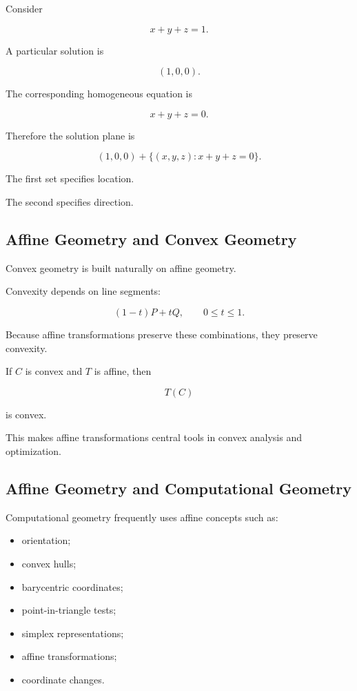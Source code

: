 Consider

\[ x+y+z=1. \]

A particular solution is

\[ (1,0,0). \]

The corresponding homogeneous equation is

\[ x+y+z=0. \]

Therefore the solution plane is

\[
\boxed{
(1,0,0)+
\{(x,y,z):x+y+z=0\}.
}
\]

The first set specifies location.

The second specifies direction.

\subsection{Affine Geometry and Convex Geometry}
\label{subsec:affine-convex-geometry}

Convex geometry is built naturally on affine geometry.

Convexity depends on line segments:

\[
(1-t)P+tQ,\qquad0\leq t\leq1.
\]

Because affine transformations preserve these combinations, they preserve
convexity.

If \(C\) is convex and \(T\) is affine, then

\[ T(C) \]

is convex.

This makes affine transformations central tools in convex analysis and
optimization.

\subsection{Affine Geometry and Computational Geometry}
\label{subsec:affine-computational-geometry}

Computational geometry frequently uses affine concepts such as:

\begin{itemize}
    \item orientation;
    \item convex hulls;
    \item barycentric coordinates;
    \item point-in-triangle tests;
    \item simplex representations;
    \item affine transformations;
    \item coordinate changes.
\end{itemize}

